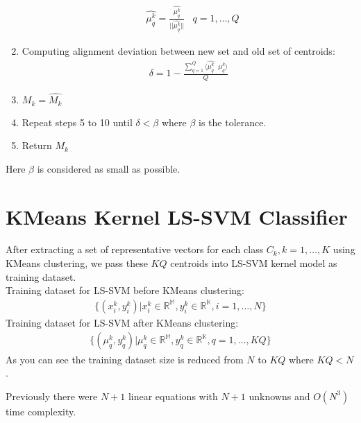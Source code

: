 \documentclass[conference]{IEEEtran}
\begin{document}
\begin{enumerate}
        \begin{align*}
        & \hat{\mu_{q}^{k}} = \frac{\hat{\mu_{q}^{k}}}{|| \hat{\mu_{q}^{k}} ||}
        & q=1,\ldots,Q
        \end{align*}
        \item Computing alignment deviation between new set and old set of centroids:
        \begin{align*}
        \delta = 1 - \frac{\sum_{q=1}^{Q}\langle \hat{\mu_{q}^{k}}\; \; \mu_{q}^{k} \rangle}{Q}
        \end{align*}
        \item $M_{k} = \hat{M_{k}}$
        \item Repeat steps 5 to 10 until $\delta < \beta $ where $\beta$ is the tolerance.
        \item Return $M_{k}$
    \end{enumerate}

    Here $\beta$ is considered as small as possible.


    \section{KMeans Kernel LS-SVM Classifier}\label{sec:kmeans-kernel-ls-svm-classifier}
    After extracting a set of representative vectors for each class
    $C_{k}, k=1,\ldots,K$ using KMeans clustering,
    we pass these $KQ$ centroids into LS-SVM kernel model as training dataset. \\
    Training dataset for LS-SVM before KMeans clustering:
    \begin{align*}
        \{(x_{i}^{k},y_{i}^{k})| x_{i}^{k} \in \mathbb{R^{M}},y_{i}^{k} \in \mathbb{R^{K}}, i=1,\ldots,N\}
    \end{align*}
    Training dataset for LS-SVM after KMeans clustering:
    \begin{align*}
        \{(\mu_{q}^{k},y_{q}^{k})| \mu_{q}^{k} \in \mathbb{R^{M}},y_{q}^{k} \in \mathbb{R^{K}}, q=1,\ldots,KQ\}
    \end{align*}
    As you can see the training dataset size is reduced from $N$ to $KQ$ where $KQ<N$.

    Previously there were $N+1$ linear equations with $N+1$ unknowns and $O(N^3)$ time complexity.
\end{document}
